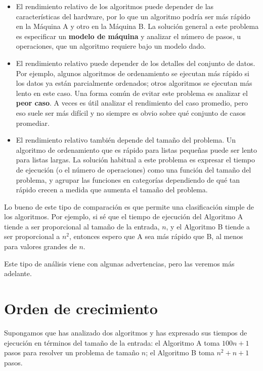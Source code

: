 \begin{itemize}
    \item El rendimiento relativo de los algoritmos puede depender de las características del hardware, por lo que un algoritmo podría ser más rápido en la Máquina A y otro en la Máquina B. La solución general a este problema es especificar un \textbf{modelo de máquina} y analizar el número de pasos, u operaciones, que un algoritmo requiere bajo un modelo dado.
    
    \item El rendimiento relativo puede depender de los detalles del conjunto de datos. Por ejemplo, algunos algoritmos de ordenamiento se ejecutan más rápido si los datos ya están parcialmente ordenados; otros algoritmos se ejecutan más lento en este caso. Una forma común de evitar este problema es analizar el \textbf{peor caso}. A veces es útil analizar el rendimiento del caso promedio, pero eso suele ser más difícil y no siempre es obvio sobre qué conjunto de casos promediar.
    
    \item El rendimiento relativo también depende del tamaño del problema. Un algoritmo de ordenamiento que es rápido para listas pequeñas puede ser lento para listas largas. La solución habitual a este problema es expresar el tiempo de ejecución (o el número de operaciones) como una función del tamaño del problema, y agrupar las funciones en categorías dependiendo de qué tan rápido crecen a medida que aumenta el tamaño del problema.
\end{itemize}

Lo bueno de este tipo de comparación es que permite una clasificación simple de los algoritmos. Por ejemplo, si sé que el tiempo de ejecución del Algoritmo A tiende a ser proporcional al tamaño de la entrada, \( n \), y el Algoritmo B tiende a ser proporcional a \( n^2 \), entonces espero que A sea más rápido que B, al menos para valores grandes de \( n \).

Este tipo de análisis viene con algunas advertencias, pero las veremos más adelante.

\section{Orden de crecimiento}

Supongamos que has analizado dos algoritmos y has expresado sus tiempos de ejecución en términos del tamaño de la entrada: el Algoritmo A toma \( 100n + 1 \) pasos para resolver un problema de tamaño \( n \); el Algoritmo B toma \( n^2 + n + 1 \) pasos.


